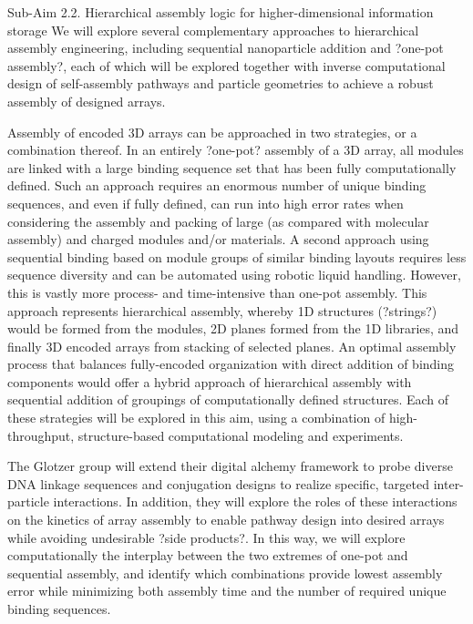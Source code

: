 Sub-Aim 2.2. Hierarchical assembly logic for higher-dimensional information storage
We will explore several complementary approaches to hierarchical assembly engineering, including sequential nanoparticle addition and ?one-pot assembly?, each of which will be explored together with inverse computational design of self-assembly pathways and particle geometries to achieve a robust assembly of designed arrays. 

Assembly of encoded 3D arrays can be approached in two strategies, or a combination thereof. In an entirely ?one-pot? assembly of a 3D array, all modules are linked with a large binding sequence set that has been fully computationally defined. Such an approach requires an enormous number of unique binding sequences, and even if fully defined, can run into high error rates when considering the assembly and packing of large (as compared with molecular assembly) and charged modules and/or materials. A second approach using sequential binding based on module groups of similar binding layouts requires less sequence diversity and can be automated using robotic liquid handling. However, this is vastly more process- and time-intensive than one-pot assembly. This approach represents hierarchical assembly, whereby 1D structures (?strings?) would be formed from the modules, 2D planes formed from the 1D libraries, and finally 3D encoded arrays from stacking of selected planes. An optimal assembly process that balances fully-encoded organization with direct addition of binding components would offer a hybrid approach of hierarchical assembly with sequential addition of groupings of computationally defined structures. Each of these strategies will be explored in this aim, using a combination of high-throughput, structure-based computational modeling and experiments.

The Glotzer group will extend their digital alchemy framework to probe diverse DNA linkage sequences and conjugation designs to realize specific, targeted inter-particle interactions. In addition, they will explore the roles of these interactions on the kinetics of array assembly to enable pathway design \cite{Jankowski_2012_SoftMatter} into desired arrays while avoiding undesirable ?side products?. In this way, we will explore computationally the interplay between the two extremes of one-pot and sequential assembly, and identify which combinations provide lowest assembly error while minimizing both assembly time and the number of required unique binding sequences.


